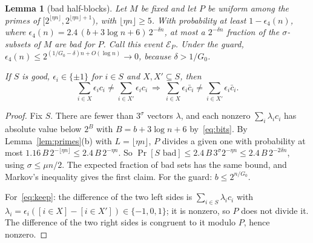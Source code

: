 \documentclass[11pt]{article}
\newtheorem{lemma}{Lemma}[section]
\theoremstyle{definition}
\newcommand{\bc}{\bar c}
\newcommand{\floor}[1]{\lfloor #1\rfloor}
\newcommand{\cE}{\mathcal E}
\begin{document}
\begin{lemma}[bad half-blocks]\label{lem:A4}
Let $M$ be fixed and let $P$ be uniform among the primes of $[2^{\floor{\eta n}},2^{\floor{\eta n}+1})$, with
$\floor{\eta n}\ge5$. With probability at least $1-\epsilon_4(n)$, where
$\epsilon_4(n)=2.4\,(b+3\log n+6)\,2^{-\delta n}$, at most a $2^{-\delta n}$ fraction of the $\sigma$-subsets of $M$ are
bad for $P$. Call this event $\cE_P$. Under the guard, $\epsilon_4(n)\le 2^{(1/G_0-\delta)n+O(\log n)}\to0$, because
$\delta>1/G_0$.

If $S$ is good, $\epsilon_i\in\{\pm1\}$ for $i\in S$ and $X,X'\subseteq S$, then
\begin{equation}\label{eq:keep}
 \sum_{i\in X}\epsilon_ic_i\ne\sum_{i\in X'}\epsilon_ic_i\ \Longrightarrow\ \sum_{i\in X}\epsilon_i\bc_i\ne\sum_{i\in X'}\epsilon_i\bc_i .
\end{equation}
\end{lemma}
\begin{proof}
Fix $S$. There are fewer than $3^\sigma$ vectors $\lambda$, and each nonzero $\sum_i\lambda_ic_i$ has absolute value
below $2^{B}$ with $B=b+3\log n+6$ by~\eqref{eq:bits}. By Lemma~\ref{lem:primes}(b) with $L=\floor{\eta n}$, $P$
divides a given one with probability at most $1.16\,B\,2^{-\floor{\eta n}}\le2.4\,B\,2^{-\eta n}$. So
$\Pr[S\text{ bad}]\le2.4\,B\,3^{\sigma}2^{-\eta n}\le2.4\,B\,2^{-2\delta n}$, using $\sigma\le\mu n/2$. The expected
fraction of bad sets has the same bound, and Markov's inequality gives the first claim. For the guard: $b\le2^{n/G_0}$.

For~\eqref{eq:keep}: the difference of the two left sides is $\sum_{i\in S}\lambda_ic_i$ with
$\lambda_i=\epsilon_i([i\in X]-[i\in X'])\in\{-1,0,1\}$; it is nonzero, so $P$ does not divide it. The difference of
the two right sides is congruent to it modulo $P$, hence nonzero.
\end{proof}
\end{document}

